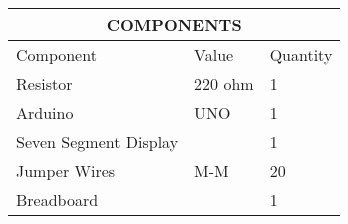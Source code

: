 	\begin{center}
\begin{tabular}{|p{5cm}|p{3cm}|p{2cm}|}
	\hline
	\multicolumn{3}{|c|}{COMPONENTS}\\
	\hline
	Component& Value& Quantity\\
	\hline
	Resistor& 220 ohm& 1\\
	\hline
	Arduino& UNO& 1\\
	\hline
	Seven Segment Display& & 1\\
	\hline
	Jumper Wires& M-M& 20\\
	\hline
	Breadboard& & 1\\
	\hline
\end{tabular}
	\end{center}
